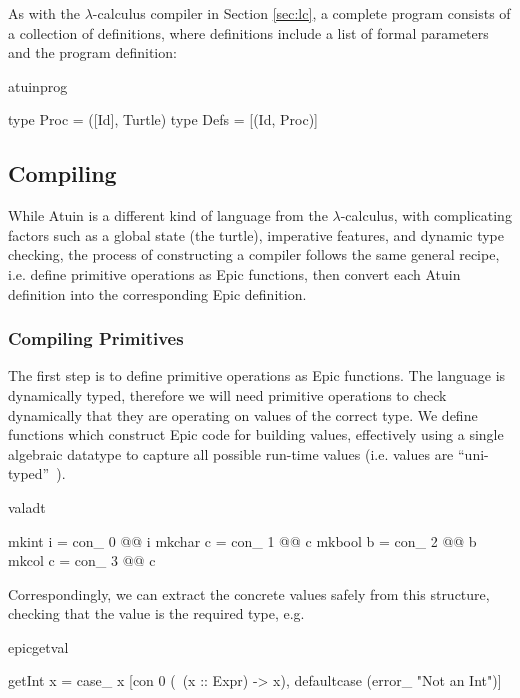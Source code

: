 \noindent
As with the $\lambda$-calculus compiler in Section \ref{sec:lc}, a
complete program consists of a collection of definitions,
where definitions include a list of formal parameters and the
program definition:

\begin{SaveVerbatim}{atuinprog}

type Proc = ([Id], Turtle)
type Defs = [(Id,  Proc)]
\end{SaveVerbatim}

\subsection{Compiling}

While Atuin is a different kind of language from the
$\lambda$-calculus, with complicating factors such as a global state
(the turtle), imperative features, and dynamic type checking, the
process of constructing a compiler follows the same general recipe, i.e.
define primitive operations as Epic functions, then convert each Atuin
definition into the corresponding Epic definition.

\subsubsection{Compiling Primitives}

The first step is to define primitive operations as Epic functions.
The language is dynamically typed, therefore we will need primitive
operations to check dynamically that they are operating on values of
the correct type. We define functions which construct Epic code for
building values, effectively using a single algebraic datatype to
capture all possible run-time values (i.e. values are
``uni-typed''~\cite{wadlerblame}).

\begin{SaveVerbatim}{valadt}

mkint  i = con_ 0 @@ i
mkchar c = con_ 1 @@ c
mkbool b = con_ 2 @@ b
mkcol  c = con_ 3 @@ c

\end{SaveVerbatim}

\noindent
Correspondingly, we can extract the concrete values safely from this
structure, checking that the value is the required type, e.g.

\begin{SaveVerbatim}{epicgetval}

getInt x  = case_ x [con 0 (\ (x :: Expr) -> x), 
                     defaultcase (error_ "Not an Int")]

\end{SaveVerbatim}

